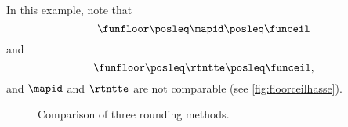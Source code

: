 \begin{example}
    In this example, note that
    \begin{equation}
        \funfloor \posleq \mapid \posleq \funceil
    \end{equation}
    and
    \begin{equation}
        \funfloor \posleq \rtntte \posleq \funceil,
    \end{equation}
    and $\mapid$ and $\rtntte$ are not comparable (see \cref{fig:floorceilhasse}).
    \begin{marginfigure}
        \caption{}
        \label{fig:floorceilhasse}
    \end{marginfigure}
\end{example}

\begin{figure*}[b]
    \centering
    \hfill
    \hfill
    \caption{Comparison of three rounding methods.}
\end{figure*}
